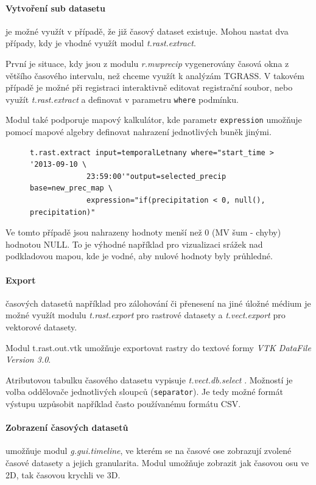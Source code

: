 \documentclass[a4paper,12pt,oneside]{report}
\begin{document}
\paragraph*{Vytvoření sub datasetu} je možné využít v případě, že již časový dataset existuje. Mohou nastat dva případy, kdy je vhodné využít modul \textit{t.rast.extract}. 

První je situace, kdy jsou z modulu \textit{r.mwprecip} vygenerovány časová okna z většího časového intervalu, než chceme využít k analýzám TGRASS. V takovém případě je možné při registraci interaktivně editovat registrační soubor, nebo využít \textit{t.rast.extract} a definovat v parametru \texttt{where} podmínku.

Modul také podporuje mapový kalkulátor, kde parametr \texttt{expression} umožňuje pomocí mapové algebry definovat nahrazení jednotlivých buněk jinými. 
\begin{figure}[h!]
\begin{footnotesize}
\lstset{extendedchars=false,
escapeinside=''}
\begin{lstlisting}[style=mybash]
t.rast.extract input=temporalLetnany where="start_time > '2013-09-10 \
             23:59:00'"output=selected_precip base=new_prec_map \
             expression="if(precipitation < 0, null(), precipitation)" 
\end{lstlisting}
\end{footnotesize} 
\end{figure}
Ve tomto případě  jsou nahrazeny hodnoty menší než 0 (MV šum - chyby) hodnotou NULL. To je výhodné například pro vizualizaci srážek nad podkladovou mapou, kde je vodné, aby nulové hodnoty byly průhledné.

\paragraph*{Export} časových datasetů například pro zálohování či přenesení na jiné úložné médium je  možné využít modulu \textit{t.rast.export} pro rastrové datasety a \textit{t.vect.export} pro vektorové datasety.

Modul {t.rast.out.vtk} umožňuje exportovat rastry do textové formy \textit{VTK DataFile Version 3.0}. 

Atributovou tabulku časového datasetu vypisuje \textit{ t.vect.db.select }. Možností je volba oddělovače jednotlivých sloupců (\texttt{separator}). Je tedy možné formát výstupu uzpůsobit například často používanému  formátu CSV.


\paragraph*{Zobrazení časových datasetů } umožňuje modul \emph{g.gui.timeline}, ve kterém se na časové ose zobrazují zvolené časové datasety a jejich granularita. Modul umožňuje zobrazit jak časovou osu ve 2D, tak časovou krychli ve 3D.
\end{document}
